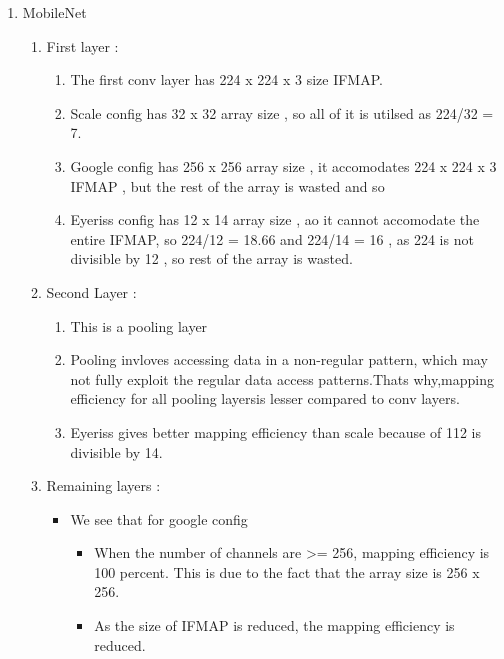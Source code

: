 \documentclass[12pt]{article}
\begin{document}
\begin{enumerate}
    \item MobileNet
    \begin{enumerate}
        \item First layer :
        \begin{enumerate}
            \item The first conv layer has 224 x 224 x 3 size IFMAP.
            \item Scale config has 32 x 32 array size , so all of it is utilsed  as 224/32 = 7.
            \item Google config has 256 x 256 array size , it accomodates 224 x 224 x 3 IFMAP , but the rest of the array is wasted and so
            \item Eyeriss config has 12 x 14 array size , ao it cannot accomodate the entire IFMAP, so 224/12 = 18.66 and 224/14 = 16 , as 224 is not divisible by 12 , so rest of the array is wasted.
        \end{enumerate}

        \item Second Layer :
        \begin{enumerate}
            \item This is a pooling layer
            \item Pooling invloves accessing data in a non-regular pattern, which may not fully exploit the regular data access patterns.Thats why,mapping efficiency for all pooling layersis lesser compared to conv layers.
            \item Eyeriss gives better mapping efficiency than scale because of 112 is divisible by 14.
        \end{enumerate}

        \item Remaining layers :
        \begin{itemize}
            \item We see that for google config 
            \begin{itemize}
                \item When the number of channels are >= 256, mapping efficiency is 100 percent. This is due to the fact that the array size is 256 x 256.
                \item As the size of IFMAP is reduced, the mapping efficiency is reduced.
            \end{itemize} 
        \end{itemize}
    \end{enumerate}


\end{enumerate}
\end{document}
